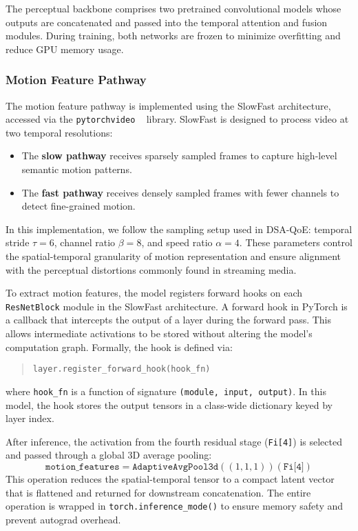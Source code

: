 The perceptual backbone comprises two pretrained convolutional models whose outputs are concatenated and passed into the temporal attention and fusion modules. During training, both networks are frozen to minimize overfitting and reduce GPU memory usage.

\subsubsection{Motion Feature Pathway}

The motion feature pathway is implemented using the SlowFast architecture, accessed via the \texttt{pytorchvideo} ~\cite{fan2021pytorchvideodeeplearninglibrary} library. SlowFast is designed to process video at two temporal resolutions:
\begin{itemize}
    \item The \textbf{slow pathway} receives sparsely sampled frames to capture high-level semantic motion patterns.
    \item The \textbf{fast pathway} receives densely sampled frames with fewer channels to detect fine-grained motion.
\end{itemize}

In this implementation, we follow the sampling setup used in DSA-QoE: temporal stride $\tau=6$, channel ratio $\beta=8$, and speed ratio $\alpha=4$. These parameters control the spatial-temporal granularity of motion representation and ensure alignment with the perceptual distortions commonly found in streaming media.

To extract motion features, the model registers forward hooks on each \texttt{ResNetBlock} module in the SlowFast architecture. A forward hook in PyTorch is a callback that intercepts the output of a layer during the forward pass. This allows intermediate activations to be stored without altering the model's computation graph. Formally, the hook is defined via:
\begin{quote}
\texttt{layer.register\_forward\_hook(hook\_fn)}
\end{quote}
where \texttt{hook\_fn} is a function of signature \texttt{(module, input, output)}. In this model, the hook stores the output tensors in a class-wide dictionary keyed by layer index.

After inference, the activation from the fourth residual stage (\texttt{Fi[4]}) is selected and passed through a global 3D average pooling:
\[
\texttt{motion\_features} = \texttt{AdaptiveAvgPool3d}((1,1,1))(\texttt{Fi[4]})
\]
This operation reduces the spatial-temporal tensor to a compact latent vector that is flattened and returned for downstream concatenation. The entire operation is wrapped in \texttt{torch.inference\_mode()} to ensure memory safety and prevent autograd overhead.

